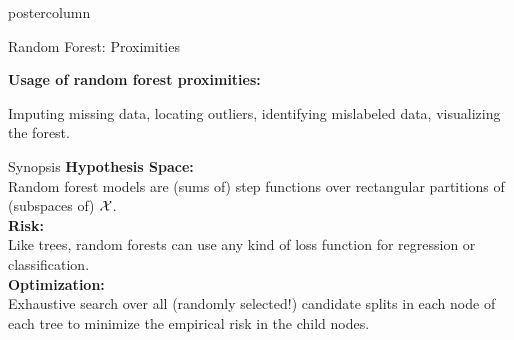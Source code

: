 \documentclass{beamer}
\begin{document}
\begin{frame}[fragile]{}
\begin{columns}
\begin{column}{.31\textwidth}
\begin{beamercolorbox}[center]{postercolumn}
\begin{minipage}{.98\textwidth}
{\begin{myblock}{Random Forest: Proximities}
\hspace*{1ex}

\begin{codebox}
\textbf{Usage of random forest proximities: }
\end{codebox}
Imputing missing data, locating outliers, identifying mislabeled data, visualizing the forest.

                    \end{myblock}
                    
             \begin{myblock}{Synopsis}
             \textbf{Hypothesis Space:}\\
            Random forest models are (sums of) step functions over rectangular partitions of (subspaces of) $\mathcal{X}$.\\

            \textbf{Risk:}\\
            Like trees, random forests can use any kind of loss function for regression or classification.\\

            \textbf{Optimization:}\\
            Exhaustive search over all (randomly selected!) candidate splits in each node of each tree to minimize the empirical risk in the child nodes.\\
             \end{myblock}
				}
			\end{minipage}
		\end{beamercolorbox}
	\end{column}
\end{columns}
\end{frame}
\end{document}
